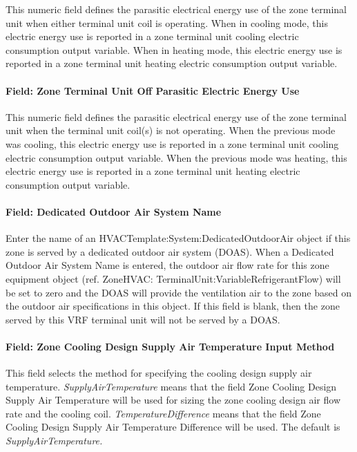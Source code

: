 This numeric field defines the parasitic electrical energy use of the zone terminal unit when either terminal unit coil is operating. When in cooling mode, this electric energy use is reported in a zone terminal unit cooling electric consumption output variable. When in heating mode, this electric energy use is reported in a zone terminal unit heating electric consumption output variable.

\paragraph{Field: Zone Terminal Unit Off Parasitic Electric Energy Use}\label{field-zone-terminal-unit-off-parasitic-electric-energy-use}

This numeric field defines the parasitic electrical energy use of the zone terminal unit when the terminal unit coil(s) is not operating. When the previous mode was cooling, this electric energy use is reported in a zone terminal unit cooling electric consumption output variable. When the previous mode was heating, this electric energy use is reported in a zone terminal unit heating electric consumption output variable.

\paragraph{Field: Dedicated Outdoor Air System Name}\label{field-dedicated-outdoor-air-system-name-5}

Enter the name of an HVACTemplate:System:DedicatedOutdoorAir object if this zone is served by a dedicated outdoor air system (DOAS). When a Dedicated Outdoor Air System Name is entered, the outdoor air flow rate for this zone equipment object (ref. ZoneHVAC: TerminalUnit:VariableRefrigerantFlow) will be set to zero and the DOAS will provide the ventilation air to the zone based on the outdoor air specifications in this object. If this field is blank, then the zone served by this VRF terminal unit will not be served by a DOAS.

\paragraph{Field: Zone Cooling Design Supply Air Temperature Input Method}\label{field-zone-cooling-design-supply-air-temperature-input-method-4}

This field selects the method for specifying the cooling design supply air temperature. \emph{SupplyAirTemperature} means that the field Zone Cooling Design Supply Air Temperature will be used for sizing the zone cooling design air flow rate and the cooling coil. \emph{TemperatureDifference} means that the field Zone Cooling Design Supply Air Temperature Difference will be used. The default is \emph{SupplyAirTemperature.}

